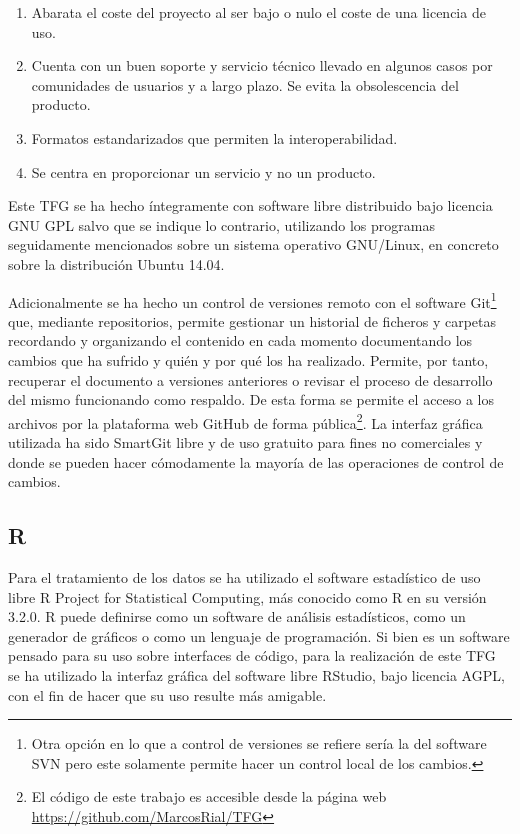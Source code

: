 \begin{enumerate}
	\item Abarata el coste del proyecto al ser bajo o nulo el coste de una licencia de uso.
	\item Cuenta con un buen soporte y servicio técnico llevado en algunos casos por comunidades de usuarios y a largo plazo. Se evita la obsolescencia del producto.
	\item Formatos estandarizados que permiten la interoperabilidad.
	\item Se centra en proporcionar un servicio y no un producto.
\end{enumerate}

Este \ac{TFG} se ha hecho íntegramente con software libre distribuido bajo licencia GNU GPL salvo que se indique lo contrario, utilizando los programas seguidamente mencionados sobre un sistema operativo GNU/Linux, en concreto sobre la distribución Ubuntu 14.04.\Sep

Adicionalmente se ha hecho un control de versiones remoto con el software Git\footnote{Otra opción en lo que a control de versiones se refiere sería la del software \ac{SVN} \citep{Latex2011} pero este solamente permite hacer un control local de los cambios.} que, mediante repositorios, permite gestionar un historial de ficheros y carpetas recordando y organizando el contenido en cada momento documentando los cambios que ha sufrido y quién y por qué los ha realizado. Permite, por tanto, recuperar el documento a versiones anteriores o revisar el proceso de desarrollo del mismo funcionando como respaldo. De esta forma se permite el acceso a los archivos por la plataforma web GitHub de forma pública\footnote{El código de este trabajo es accesible desde la página web \url{https://github.com/MarcosRial/TFG}}. La interfaz gráfica utilizada ha sido SmartGit \citep{GmbH2015} libre y de uso gratuito para fines no comerciales y donde se pueden hacer cómodamente la mayoría de las operaciones de control de cambios.\Sep

\subsection{R}
Para el tratamiento de los datos se ha utilizado el software estadístico de uso libre R Project for Statistical Computing, más conocido como R \citep{R2013} en su versión 3.2.0. R puede definirse como un software de análisis estadísticos, como un generador de gráficos o como un lenguaje de programación. Si bien es un software pensado para su uso sobre interfaces de código, para la realización de este \ac{TFG} se ha utilizado la interfaz gráfica del software libre RStudio, bajo licencia AGPL, con el fin de hacer que su uso resulte más amigable.\Sep

